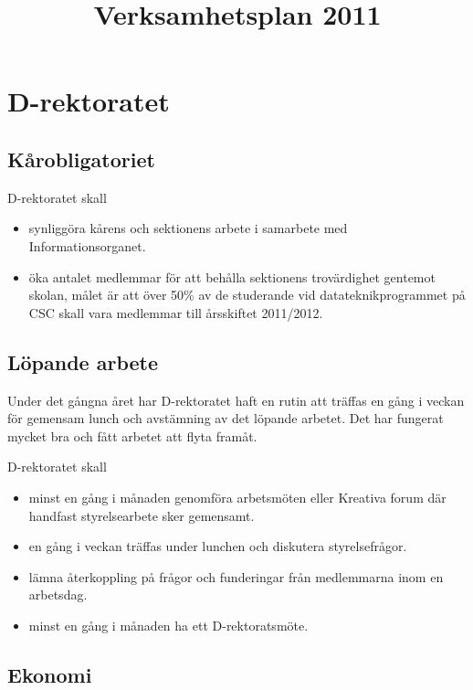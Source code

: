 \documentclass{dgovdoc}
\title{Verksamhetsplan 2011}
\begin{document}
\maketitle

\section{D-rektoratet}

\subsection{Kårobligatoriet}

D-rektoratet skall

\begin{itemize}
\item synliggöra kårens och sektionens arbete i samarbete med Informationsorganet.
\item öka antalet medlemmar för att behålla sektionens trovärdighet gentemot
  skolan, målet är att över 50\% av de studerande vid datateknikprogrammet på CSC
  skall vara medlemmar till årsskiftet 2011/2012.
\end{itemize}

\subsection{Löpande arbete}

Under det gångna året har D-rektoratet haft en rutin att träffas en gång i
veckan för gemensam lunch och avstämning av det löpande arbetet. Det har
fungerat mycket bra och fått arbetet att flyta framåt.

D-rektoratet skall

\begin{itemize}
\item minst en gång i månaden genomföra arbetsmöten eller Kreativa forum där
  handfast styrelsearbete sker gemensamt.
\item en gång i veckan träffas under lunchen och diskutera styrelsefrågor.
\item lämna återkoppling på frågor och funderingar från medlemmarna inom en
  arbetsdag.
\item minst en gång i månaden ha ett D-rektoratsmöte.
\end{itemize}

\subsection{Ekonomi}
\end{document}
